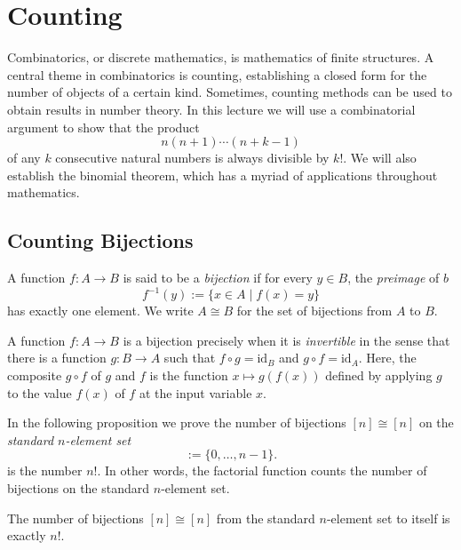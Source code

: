 \chapter{Counting}\label{chapter:combinatorial-methods}

Combinatorics, or discrete mathematics, is mathematics of finite structures. A central theme in combinatorics is counting, establishing a closed form for the number of objects of a certain kind. Sometimes, counting methods can be used to obtain results in number theory. In this lecture we will use a combinatorial argument to show that the product
\begin{equation*}
  n(n+1)\cdots(n+k-1)
\end{equation*}
of any $k$ consecutive natural numbers is always divisible by $k!$. We will also establish the binomial theorem, which has a myriad of applications throughout mathematics.

\section{Counting Bijections}

\begin{definition}
  A function $f:A \to B$ is said to be a \emph{bijection} if for every $y\in B$, the \emph{preimage} of $b$
\begin{equation*}
  f^{-1}(y) := \{x\in A\mid f(x)=y\}
\end{equation*}
has exactly one element. We write $A\cong B$ for the set of bijections from $A$ to $B$.
\end{definition}

A function $f:A \to B$ is a bijection precisely when it is \emph{invertible} in the sense that there is a function $g:B\to A$ such that $f\circ g=\mathrm{id}_B$ and $g\circ f=\mathrm{id}_A$. Here, the composite $g\circ f$ of $g$ and $f$ is the function $x\mapsto g(f(x))$ defined by applying $g$ to the value $f(x)$ of $f$ at the input variable $x$.

In the following proposition we prove the number of bijections $[n]\cong[n]$ on the \emph{standard $n$-element set}
\begin{equation*}
  [n] := \{0,\ldots,n-1\}.
\end{equation*}
is the number $n!$. In other words, the factorial function counts the number of bijections on the standard $n$-element set.

\begin{proposition}
  The number of bijections $[n]\cong [n]$ from the standard $n$-element set to itself is exactly $n!$.
\end{proposition}

